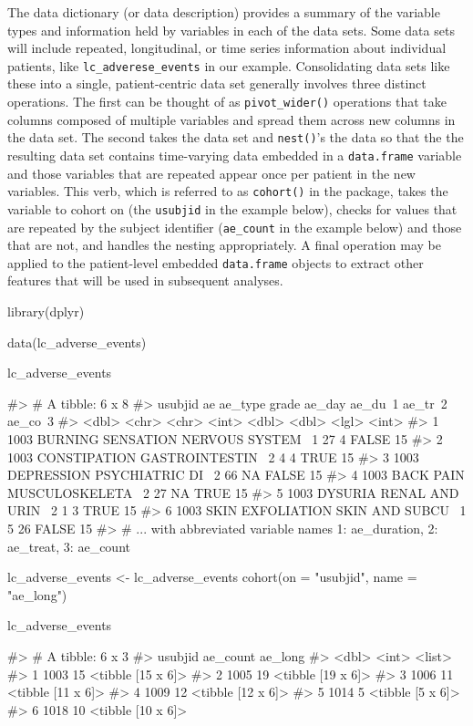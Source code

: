 The data dictionary (or data description) provides a summary of the
variable types and information held by variables in each of the data
sets. Some data sets will include repeated, longitudinal, or time series
information about individual patients, like
\texttt{lc\_adverese\_events} in our example. Consolidating data sets
like these into a single, patient-centric data set generally involves
three distinct operations. The first can be thought of as
\texttt{pivot\_wider()} operations that take columns composed of
multiple variables and spread them across new columns in the data set.
The second takes the data set and \texttt{nest()}'s the data so that the
the resulting data set contains time-varying data embedded in a
\texttt{data.frame} variable and those variables that are repeated
appear once per patient in the new variables. This verb, which is
referred to as \texttt{cohort()} in the package, takes the variable to
cohort on (the \texttt{usubjid} in the example below), checks for values
that are repeated by the subject identifier (\texttt{ae\_count} in the
example below) and those that are not, and handles the nesting
appropriately. A final operation may be applied to the patient-level
embedded \texttt{data.frame} objects to extract other features that will
be used in subsequent analyses.

\begin{Schunk}
\begin{Sinput}
library(dplyr)

data(lc_adverse_events)

lc_adverse_events %>% head()
\end{Sinput}
\begin{Soutput}
#> # A tibble: 6 x 8
#>   usubjid ae                ae_type         grade ae_day ae_du~1 ae_tr~2 ae_co~3
#>     <dbl> <chr>             <chr>           <int>  <dbl>   <dbl> <lgl>     <int>
#> 1    1003 BURNING SENSATION NERVOUS SYSTEM~     1     27       4 FALSE        15
#> 2    1003 CONSTIPATION      GASTROINTESTIN~     2      4       4 TRUE         15
#> 3    1003 DEPRESSION        PSYCHIATRIC DI~     2     66      NA FALSE        15
#> 4    1003 BACK PAIN         MUSCULOSKELETA~     2     27      NA TRUE         15
#> 5    1003 DYSURIA           RENAL AND URIN~     2      1       3 TRUE         15
#> 6    1003 SKIN EXFOLIATION  SKIN AND SUBCU~     1      5      26 FALSE        15
#> # ... with abbreviated variable names 1: ae_duration, 2: ae_treat, 3: ae_count
\end{Soutput}
\begin{Sinput}
lc_adverse_events <- lc_adverse_events %>%
  cohort(on = "usubjid", name = "ae_long")

lc_adverse_events %>% head()
\end{Sinput}
\begin{Soutput}
#> # A tibble: 6 x 3
#>   usubjid ae_count ae_long          
#>     <dbl>    <int> <list>           
#> 1    1003       15 <tibble [15 x 6]>
#> 2    1005       19 <tibble [19 x 6]>
#> 3    1006       11 <tibble [11 x 6]>
#> 4    1009       12 <tibble [12 x 6]>
#> 5    1014        5 <tibble [5 x 6]> 
#> 6    1018       10 <tibble [10 x 6]>
\end{Soutput}
\end{Schunk}

